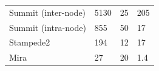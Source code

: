 \documentclass[aspectratio=169]{beamer}
\begin{document}
\begin{frame}
\begin{columns}
\begin{column}{0.7\textwidth}
{\begin{table}[]
\begin{tabular}{llll}
          Summit (inter-node) & 5130         & 25          & 205     \\
          Summit (intra-node) & 855          & 50          & 17      \\
          Stampede2           & 194          & 12          & 17      \\
          Mira                & 27           & 20          & 1.4
        \end{tabular}
      \end{table}
      }
    \end{column}
  \end{columns}
\end{frame}


\end{document}
